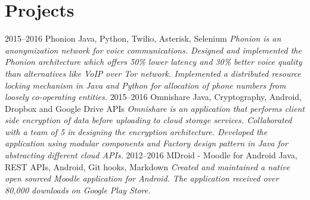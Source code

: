 \documentclass[]{friggeri-cv}
\begin{document}
\section{Projects}
    \begin{entrylist}
        \entry
            {2015–2016}
            {Phonion}
            {Java, Python, Twilio, Asterisk, Selenium}
            {\emph{Phonion is an anonymization network for voice communications. Designed and implemented the Phonion architecture which offers 50\% lower latency and 30\% better voice quality than alternatives like VoIP over Tor network. Implemented a distributed resource locking mechanism in Java and Python for allocation of phone numbers from loosely co-operating entities.}}
        \entry
            {2015–2016}
            {Omnishare}
            {Java, Cryptography, Android, Dropbox and Google Drive APIs}
            {\emph{Omnishare is an application that performs client side encryption of data before uploading to cloud storage services. Collaborated with a team of 5 in designing the encryption architecture. Developed the application using modular components and Factory design pattern in Java for abstracting different cloud APIs.}}
        \entry
            {2012–2016}
            {MDroid - Moodle for Android}
            {Java, REST APIs, Android, Git hooks, Markdown}
            {\emph{Created and maintained a native open sourced Moodle application for Android. The application received over 80,000 downloads on Google Play Store.}}
    \end{entrylist}
\end{document}
